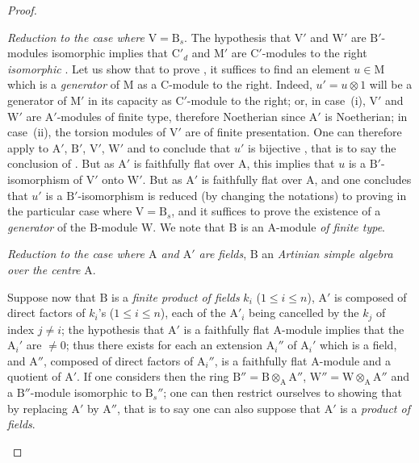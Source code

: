 \begin{proof}
\begin{env}[2.5.8.7]
\label{IV.2.5.8.7}
\emph{Reduction to the case where} $\mathrm{V}=\mathrm{B}_s$. The hypothesis that $\mathrm{V}'$ and $\mathrm{W}'$ are $\mathrm{B}'$-modules isomorphic implies
that $\mathrm{C}'_d$ and $\mathrm{M}'$ are $\mathrm{C}'$-modules to the right \emph{isomorphic} . Let us show that to prove , it suffices to
find an element $u\in\mathrm{M}$ which is a \emph{generator} of $\mathrm{M}$ as a $\mathrm{C}$-module to the right. Indeed, $u'=u\otimes 1$ will be a
generator of $\mathrm{M}'$ in its capacity as $\mathrm{C}'$-module to the right; or, in case~(i), $\mathrm{V}'$ and $\mathrm{W}'$ are $\mathrm{A}'$-modules of finite type,
therefore Noetherian since $\mathrm{A}'$ is Noetherian; in case~(ii), the torsion
modules of $\mathrm{V}'$ are of finite presentation. One can therefore apply  to $\mathrm{A}'$, $\mathrm{B}'$, $\mathrm{V}'$, $\mathrm{W}'$ and to conclude
that $u'$ is bijective , that is to say the
conclusion of . But as $\mathrm{A}'$ is faithfully flat over $\mathrm{A}$, this implies that $u$ is a $\mathrm{B}'$-isomorphism
of $\mathrm{V}'$ onto $\mathrm{W}'$. But as $\mathrm{A}'$ is faithfully flat over $\mathrm{A}$, and one concludes that $u'$ is a $\mathrm{B}'$-isomorphism
is reduced (by changing the notations) to proving  in the particular case where $\mathrm{V}=\mathrm{B}_s$, and it suffices to
prove the existence of a \emph{generator} of the $\mathrm{B}$-module $\mathrm{W}$. We note that $\mathrm{B}$ is an $\mathrm{A}$-module \emph{of finite type}.
\end{env}

\begin{env}[2.5.8.8]
\label{IV.2.5.8.8}
\emph{Reduction to the case where $\mathrm{A}$ and $\mathrm{A}'$ are fields}, $\mathrm{B}$ an \emph{Artinian simple algebra over the centre} $\mathrm{A}$.

Suppose now that $\mathrm{B}$ is a \emph{finite product of fields} $k_i$ ($1\leq i\leq n$), $\mathrm{A}'$ is composed of direct
factors of $k_i$'s ($1\leq i\leq n$), each of the $\mathrm{A}'_i$ being cancelled by the $k_j$ of index $j\neq i$; the hypothesis that $\mathrm{A}'$ is a
faithfully flat $\mathrm{A}$-module implies that the $\mathrm{A}_i'$ are $\neq 0$; thus there exists for each an extension $\mathrm{A}_i''$ of $\mathrm{A}_i'$ which is a field,
and $\mathrm{A}''$, composed of direct factors of $\mathrm{A}_i''$, is a faithfully flat $\mathrm{A}$-module and a quotient of $\mathrm{A}'$. If one considers then
the ring $\mathrm{B}''=\mathrm{B}\otimes_{\mathrm{A}}\mathrm{A}''$, $\mathrm{W}''=\mathrm{W}\otimes_{\mathrm{A}}\mathrm{A}''$ and a $\mathrm{B}''$-module isomorphic to $\mathrm{B}_s''$; one can then
restrict ourselves to showing that  by replacing $\mathrm{A}'$ by $\mathrm{A}''$, that is to say one can also suppose that $\mathrm{A}'$ is a \emph{product
of fields}.


\end{env}
\end{proof}
